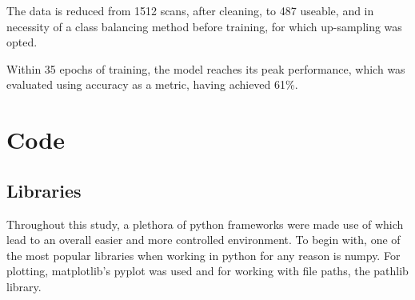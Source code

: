 \documentclass[a4paper, 12pt]{article}
\begin{document}
The data is reduced from 1512 scans, after cleaning, to 487 useable, and in necessity of a class balancing method before training, for which
up-sampling was opted.

Within 35 epochs of training, the model reaches its peak performance, which was evaluated using accuracy as a metric, having achieved 61\%.









\newpage
\section{Code}
\subsection{Libraries}
Throughout this study, a plethora of python frameworks were made use of which lead to an overall easier and more controlled environment.
To begin with, one of the most popular libraries when working in python for any reason is numpy. For plotting, matplotlib's pyplot was used
and for working with file paths, the pathlib library.
\end{document}
